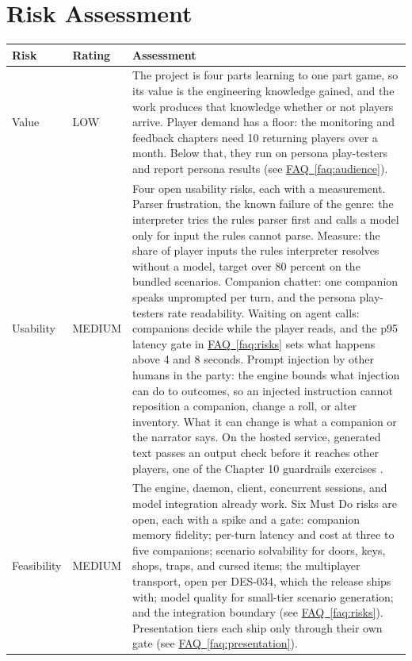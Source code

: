 \documentclass[11pt,letterpaper]{article}
\newcommand{\faqref}[1]{\hyperref[#1]{FAQ~\ref*{#1}}}
\begin{document}
\newpage
\section*{Risk Assessment}

\renewcommand{\arraystretch}{1.6}
\begin{tabularx}{\textwidth}{@{} l l X @{}}
\toprule
\textbf{\color{SectionBlue}Risk} & \textbf{\color{SectionBlue}Rating} & \textbf{\color{SectionBlue}Assessment} \\
\midrule
Value      & \textcolor{RiskGreen}{LOW} & The project is four parts learning to one part game, so its value is the engineering knowledge gained, and the work produces that knowledge whether or not players arrive. Player demand has a floor: the monitoring and feedback chapters need 10 returning players over a month. Below that, they run on persona play-testers and report persona results (see \faqref{faq:audience}). \\
Usability  & \textcolor{RiskAmber}{MEDIUM} & Four open usability risks, each with a measurement. Parser frustration, the known failure of the genre: the interpreter tries the rules parser first and calls a model only for input the rules cannot parse. Measure: the share of player inputs the rules interpreter resolves without a model, target over 80 percent on the bundled scenarios. Companion chatter: one companion speaks unprompted per turn, and the persona play-testers rate readability. Waiting on agent calls: companions decide while the player reads, and the p95 latency gate in \faqref{faq:risks} sets what happens above 4 and 8 seconds. Prompt injection by other humans in the party: the engine bounds what injection can do to outcomes, so an injected instruction cannot reposition a companion, change a roll, or alter inventory. What it can change is what a companion or the narrator says. On the hosted service, generated text passes an output check before it reaches other players, one of the Chapter 10 guardrails exercises \cite{huyen2025aie}. \\
Feasibility & \textcolor{RiskAmber}{MEDIUM} & The engine, daemon, client, concurrent sessions, and model integration already work. Six Must Do risks are open, each with a spike and a gate: companion memory fidelity; per-turn latency and cost at three to five companions; scenario solvability for doors, keys, shops, traps, and cursed items; the multiplayer transport, open per DES-034, which the release ships with; model quality for small-tier scenario generation; and the integration boundary (see \faqref{faq:risks}). Presentation tiers each ship only through their own gate (see \faqref{faq:presentation}). \\

\end{tabularx}
\end{document}
